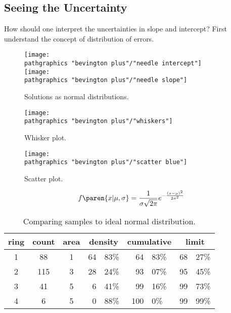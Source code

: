 \subsection{Seeing the Uncertainty}  %
How should one interpret the uncertainties in slope and intercept? First understand the concept of distribution of errors.

\begin{figure}[htbp] %
   \centering
   \texttt{[image: \\pathgraphics "bevington plus"/"needle intercept"]} \\[30pt]
   \texttt{[image: \\pathgraphics "bevington plus"/"needle slope"]}
   \caption{Solutions as normal distributions.}
\end{figure}

\begin{figure}[htbp] %
   \centering
   \texttt{[image: \\pathgraphics "bevington plus"/"whiskers"]} 
   \caption[Whisker plot.]{Whisker plot.}
\end{figure}

\begin{figure}[htbp] %
   \centering
   \texttt{[image: \\pathgraphics "bevington plus"/"scatter blue"]} 
   \caption[Scatter plot.]{Scatter plot.}
\end{figure}

  \begin{equation*}   %
    f\paren{x|\mu,\sigma} = \frac{1}{\sigma \sqrt{2\pi}} e^{-\frac{(x-\mu)^{2}}{2\sigma^{2}}}
  \end{equation*}

  \begin{table}[htbp]  %
    \caption{Comparing samples to ideal normal distribution.}
    \begin{center}
      \begin{tabular}{cccr@{.}lr@{.}lr@{.}l}
        ring & count & area &  \multicolumn{2}{c}{density} & \multicolumn{2}{c}{cumulative} & \multicolumn{2}{c}{limit} \\\hline
        1 &  88 & 1 & 64 & 83\% & 64 & 83\% & 68 & 27\% \\
        2 & 115 & 3 & 28 & 24\% & 93 & 07\% & 95 & 45\% \\
        3 &  41 & 5 & 6 & 41\% & 99 & 16\% & 99 & 73\%\\
        4 &   6 & 5 & 0 & 88\% & 100 & 0\% & 99 & 99\%\\
      \end{tabular}
    \end{center}
  \end{table}%

\endinput